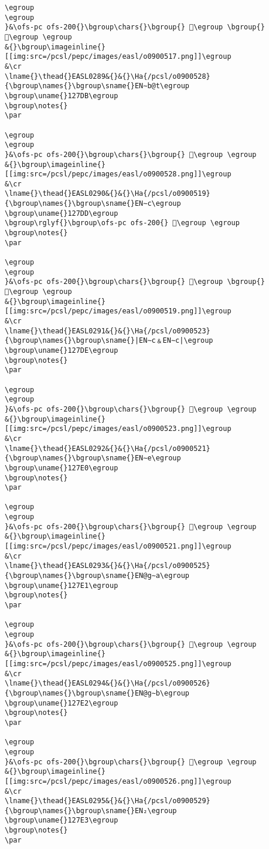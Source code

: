 \begin{verbatim}
\egroup
\egroup
}&\ofs-pc ofs-200{}\bgroup\chars{}\bgroup{} 𒟚\egroup \bgroup{} 𒟜\egroup \egroup
&{}\bgroup\imageinline{}[[img:src=/pcsl/pepc/images/easl/o0900517.png]]\egroup
&\cr
\lname{}\thead{}EASL0289&{}&{}\Ha{/pcsl/o0900528}{\bgroup\names{}\bgroup\sname{}EN∼b@t\egroup
\bgroup\uname{}127DB\egroup
\bgroup\notes{}
\par 

\egroup
\egroup
}&\ofs-pc ofs-200{}\bgroup\chars{}\bgroup{} 𒟛\egroup \egroup
&{}\bgroup\imageinline{}[[img:src=/pcsl/pepc/images/easl/o0900528.png]]\egroup
&\cr
\lname{}\thead{}EASL0290&{}&{}\Ha{/pcsl/o0900519}{\bgroup\names{}\bgroup\sname{}EN∼c\egroup
\bgroup\uname{}127DD\egroup
\bgroup\rglyf{}\bgroup\ofs-pc ofs-200{} 𒟝\egroup \egroup
\bgroup\notes{}
\par 

\egroup
\egroup
}&\ofs-pc ofs-200{}\bgroup\chars{}\bgroup{} 𒟝\egroup \bgroup{} 𒟟\egroup \egroup
&{}\bgroup\imageinline{}[[img:src=/pcsl/pepc/images/easl/o0900519.png]]\egroup
&\cr
\lname{}\thead{}EASL0291&{}&{}\Ha{/pcsl/o0900523}{\bgroup\names{}\bgroup\sname{}|EN∼c﹠EN∼c|\egroup
\bgroup\uname{}127DE\egroup
\bgroup\notes{}
\par 

\egroup
\egroup
}&\ofs-pc ofs-200{}\bgroup\chars{}\bgroup{} 𒟞\egroup \egroup
&{}\bgroup\imageinline{}[[img:src=/pcsl/pepc/images/easl/o0900523.png]]\egroup
&\cr
\lname{}\thead{}EASL0292&{}&{}\Ha{/pcsl/o0900521}{\bgroup\names{}\bgroup\sname{}EN∼e\egroup
\bgroup\uname{}127E0\egroup
\bgroup\notes{}
\par 

\egroup
\egroup
}&\ofs-pc ofs-200{}\bgroup\chars{}\bgroup{} 𒟠\egroup \egroup
&{}\bgroup\imageinline{}[[img:src=/pcsl/pepc/images/easl/o0900521.png]]\egroup
&\cr
\lname{}\thead{}EASL0293&{}&{}\Ha{/pcsl/o0900525}{\bgroup\names{}\bgroup\sname{}EN@g∼a\egroup
\bgroup\uname{}127E1\egroup
\bgroup\notes{}
\par 

\egroup
\egroup
}&\ofs-pc ofs-200{}\bgroup\chars{}\bgroup{} 𒟡\egroup \egroup
&{}\bgroup\imageinline{}[[img:src=/pcsl/pepc/images/easl/o0900525.png]]\egroup
&\cr
\lname{}\thead{}EASL0294&{}&{}\Ha{/pcsl/o0900526}{\bgroup\names{}\bgroup\sname{}EN@g∼b\egroup
\bgroup\uname{}127E2\egroup
\bgroup\notes{}
\par 

\egroup
\egroup
}&\ofs-pc ofs-200{}\bgroup\chars{}\bgroup{} 𒟢\egroup \egroup
&{}\bgroup\imageinline{}[[img:src=/pcsl/pepc/images/easl/o0900526.png]]\egroup
&\cr
\lname{}\thead{}EASL0295&{}&{}\Ha{/pcsl/o0900529}{\bgroup\names{}\bgroup\sname{}EN₂\egroup
\bgroup\uname{}127E3\egroup
\bgroup\notes{}
\par 


\end{verbatim}
